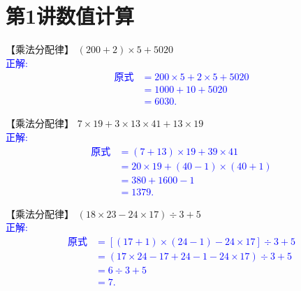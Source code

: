 \section{第1讲\quad 数值计算}

\item {
    【乘法分配律】
    $(200+2)\times 5 + 5020$
    \ifshowSolution
        \\\fangsong{}\textcolor{blue}{
            正解:
            \begin{align*}
                \mbox{原式} &= 200\times 5 + 2\times 5 + 5020 \\
                &= 1000 + 10 + 5020 \\
                &= 6030.
            \end{align*}
        }
    \else
        \vspace{1cm}
    \fi
}

\item {
    【乘法分配律】
    $7\times 19 + 3\times 13\times 41 + 13\times 19$
    \ifshowSolution
        \\\fangsong{}\textcolor{blue}{
            正解:
            \begin{align*}
                \mbox{原式} &= (7+13)\times 19 + 39\times 41 \\
                &= 20\times 19 + (40-1)\times (40+1) \\
                &= 380 + 1600 - 1 \\
                &= 1379.
            \end{align*}
        }
    \else
        \vspace{1cm}
    \fi
}

\item {
    【乘法分配律】
    $(18\times 23 - 24\times 17)\div 3 + 5$
    \ifshowSolution
        \\\fangsong{}\textcolor{blue}{
            正解:
            \begin{align*}
                \mbox{原式} &= [(17+1)\times (24-1) - 24\times 17]\div 3 + 5 \\
                &= (17\times 24 - 17 + 24 - 1 - 24\times 17)\div 3 + 5 \\
                &= 6\div 3 + 5 \\
                &= 7.
            \end{align*}
        }
    \else
        \vspace{1cm}
    \fi
}

